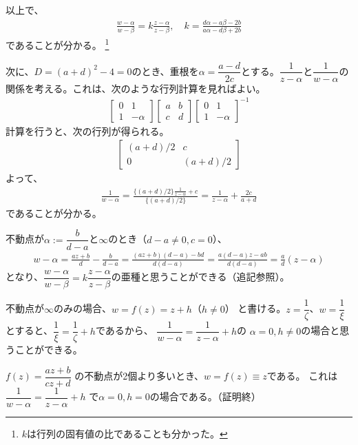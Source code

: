 以上で、
\begin{align*}
    \frac{w-\alpha}{w-\beta}
    =k\frac{z-\alpha}{z-\beta},\quad
    k=\frac{d\alpha-a\beta-2b}{a\alpha-d\beta+2b}
\end{align*}
であることが分かる。
\footnote{$k$は行列の固有値の比であることも分かった。}

次に、$D=(a+d)^2-4=0$のとき、重根を$\alpha=\dfrac{a-d}{2c}$とする。$\dfrac{1}{z-\alpha}$と$\dfrac{1}{w-\alpha}$の関係を考える。これは、次のような行列計算を見ればよい。
\begin{align*}
    \begin{bmatrix}
        0&1\\
        1&-\alpha
    \end{bmatrix}
    \begin{bmatrix}
        a&b\\
        c&d
    \end{bmatrix}
    \begin{bmatrix}
        0&1\\
        1&-\alpha
    \end{bmatrix}^{-1}
\end{align*}
計算を行うと、次の行列が得られる。
\begin{align*}
    \begin{bmatrix}
        (a+d)/2&c\\
        0&(a+d)/2
    \end{bmatrix}
\end{align*}
よって、
\begin{align*}
    \frac{1}{w-\alpha}
    =\frac{\{(a+d)/2\}\frac{1}{z-\alpha}+c}{\{(a+d)/2\}}
    =\frac{1}{z-\alpha}+\frac{2c}{a+d}
\end{align*}
であることが分かる。

不動点が$\alpha:=\dfrac{b}{d-a}$と$\infty$のとき（$d-a\neq0,c=0$）、
\begin{align*}
    w-\alpha
    =\frac{az+b}{d}-\frac{b}{d-a}
    =\frac{(az+b)(d-a)-bd}{d(d-a)}
    =\frac{a(d-a)z-ab}{d(d-a)}
    =\frac{a}{d}(z-\alpha)
\end{align*}
となり、$\dfrac{w-\alpha}{w-\beta}=k\dfrac{z-\alpha}{z-\beta}$の亜種と思うことができる（追記参照）。

不動点が$\infty$のみの場合、$w=f(z)=z+h$（$h\neq0$）
と書ける。$z=\dfrac{1}{\zeta}$、$w=\dfrac{1}{\xi}$とすると、$\dfrac{1}{\xi}=\dfrac{1}{\zeta}+h$であるから、
$\dfrac{1}{w-\alpha}=\dfrac{1}{z-\alpha}+h$の
$\alpha=0,h\neq0$の場合と思うことができる。

$f(z)=\dfrac{az+b}{cz+d}$
の不動点が2個より多いとき、$w=f(z)\equiv z$である。
これは
$\dfrac{1}{w-\alpha}=\dfrac{1}{z-\alpha}+h$
で$\alpha=0,h=0$の場合である。（証明終）

